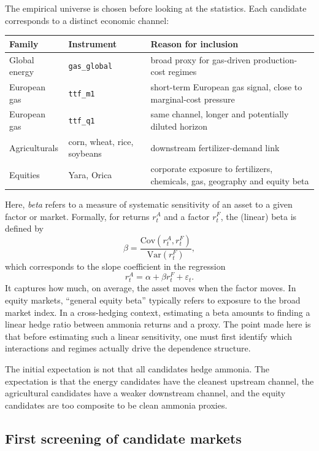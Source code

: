 \documentclass[11pt]{article}
\newcommand{\1}{\mathbf 1}
\begin{document}
The empirical universe is chosen before looking at the statistics. Each candidate corresponds to a distinct economic channel:
\begin{center}
\renewcommand{\arraystretch}{1.15}
\begin{tabularx}{0.96\textwidth}{p{3.0cm}p{2.5cm}X}
\toprule
Family & Instrument & Reason for inclusion \\
\midrule
Global energy & \texttt{gas\_global} & broad proxy for gas-driven production-cost regimes \\
European gas & \texttt{ttf\_m1} & short-term European gas signal, close to marginal-cost pressure \\
European gas & \texttt{ttf\_q1} & same channel, longer and potentially diluted horizon \\
Agriculturals & corn, wheat, rice, soybeans & downstream fertilizer-demand link \\
Equities & Yara, Orica & corporate exposure to fertilizers, chemicals, gas, geography and equity beta \\
\bottomrule
\end{tabularx}
\end{center}

Here, \emph{beta} refers to a measure of systematic sensitivity of an asset to a given factor or market. Formally, for returns $r^A_t$ and a factor $r^F_t$, the (linear) beta is defined by\[\beta = \frac{\mathrm{Cov}(r^A_t, r^F_t)}{\mathrm{Var}(r^F_t)},\]which corresponds to the slope coefficient in the regression\[r^A_t = \alpha + \beta r^F_t + \varepsilon_t.\]It captures how much, on average, the asset moves when the factor moves. In equity markets, ``general equity beta'' typically refers to exposure to the broad market index. In a cross-hedging context, estimating a beta amounts to finding a linear hedge ratio between ammonia returns and a proxy. The point made here is that before estimating such a linear sensitivity, one must first identify which interactions and regimes actually drive the dependence structure.

The initial expectation is not that all candidates hedge ammonia. The expectation is that the energy candidates have the cleanest upstream channel, the agricultural candidates have a weaker downstream channel, and the equity candidates are too composite to be clean ammonia proxies.

\subsection{First screening of candidate markets}
\end{document}
